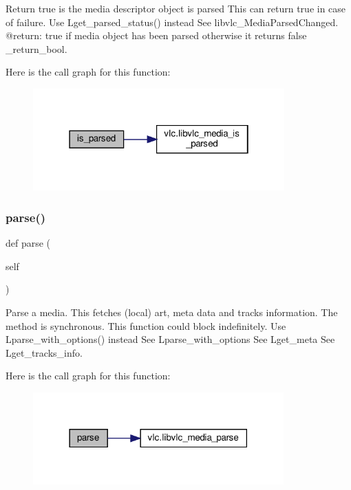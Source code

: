 \begin{DoxyVerb}Return true is the media descriptor object is parsed
\deprecated This can return true in case of failure.
    Use L{get_parsed_status}() instead
See libvlc_MediaParsedChanged.
@return: true if media object has been parsed otherwise it returns false \libvlc_return_bool.
\end{DoxyVerb}
 Here is the call graph for this function\+:
\nopagebreak
\begin{figure}[H]
\begin{center}
\leavevmode
\includegraphics[width=274pt]{classvlc_1_1_media_a94c3d6b6dcae451a9239a3ce8662e9d4_cgraph}
\end{center}
\end{figure}
\mbox{\label{classvlc_1_1_media_aed1b33c03102a60d1b12f3ec96850149}} 
\subsubsection{\texorpdfstring{parse()}{parse()}}
{\footnotesize\ttfamily def parse (\begin{DoxyParamCaption}\item[{}]{self }\end{DoxyParamCaption})}

\begin{DoxyVerb}Parse a media.
This fetches (local) art, meta data and tracks information.
The method is synchronous.
\deprecated This function could block indefinitely.
    Use L{parse_with_options}() instead
See L{parse_with_options}
See L{get_meta}
See L{get_tracks_info}.
\end{DoxyVerb}
 Here is the call graph for this function\+:
\nopagebreak
\begin{figure}[H]
\begin{center}
\leavevmode
\includegraphics[width=273pt]{classvlc_1_1_media_aed1b33c03102a60d1b12f3ec96850149_cgraph}
\end{center}
\end{figure}
\mbox{\label{classvlc_1_1_media_a186ebdfb2e9a5ad6709213c61d7e3094}} 
